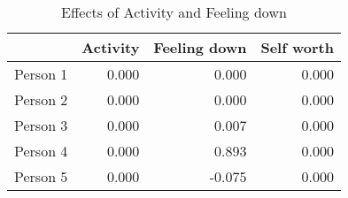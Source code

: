 \begin{table}[ht]
\centering
\begin{tabular}{rrrr}
  \toprule
 & Activity & Feeling down & Self worth \\ 
  \midrule
Person 1 & 0.000 & 0.000 & 0.000 \\ 
  Person 2 & 0.000 & 0.000 & 0.000 \\ 
  Person 3 & 0.000 & 0.007 & 0.000 \\ 
  Person 4 & 0.000 & 0.893 & 0.000 \\ 
  Person 5 & 0.000 & -0.075 & 0.000 \\ 
   \bottomrule
\end{tabular}
\caption{Effects of Activity and Feeling down} 
\label{tab:effects_in_aira}
\end{table}
